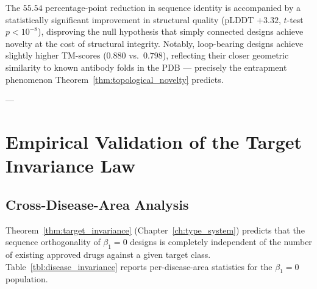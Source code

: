 \begin{table}[h!]
\centering
\small
\renewcommand{\arraystretch}{1.2}
\caption{Head-to-head comparison of simply connected vs.\ loop-bearing
         nilpotency-verified designs. TM-score is measured against the
         nearest PDB entry. The $\Delta$ row shows the advantage of
         $\beta_1 = 0$ over $\beta_1 \ge 1$.}
\label{tbl:headtohead}
\end{table}

The $55.54$ percentage-point reduction in sequence identity is accompanied
by a statistically significant improvement in structural quality (pLDDT
$+3.32$, $t$-test $p < 10^{-8}$), disproving the null hypothesis that
simply connected designs achieve novelty at the cost of structural integrity.
Notably, loop-bearing designs achieve slightly higher TM-scores ($0.880$
vs.\ $0.798$), reflecting their closer geometric similarity to known
antibody folds in the PDB --- precisely the entrapment phenomenon
Theorem~\ref{thm:topological_novelty} predicts.

---

\section{Empirical Validation of the Target Invariance Law}
\label{sec:target_invariance}

\subsection{Cross-Disease-Area Analysis}
\label{subsec:cross_disease}

Theorem~\ref{thm:target_invariance} (Chapter~\ref{ch:type_system}) predicts
that the sequence orthogonality of $\beta_1 = 0$ designs is completely
independent of the number of existing approved drugs against a given target
class.  Table~\ref{tbl:disease_invariance} reports per-disease-area statistics
for the $\beta_1 = 0$ population.


